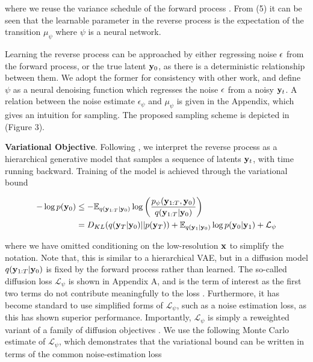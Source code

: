 where we reuse the variance schedule of the forward process \parencite{Ho2020}. From (5) it can be seen that the learnable parameter in the reverse process is the expectation of the transition $\mu_{\psi}$ where $\psi$ is a neural network. 

Learning the reverse process can be approached by either regressing noise $\bold{\epsilon}$ from the forward process, or the true latent $\bold{y}_{0}$, as there is a deterministic relationship between them. We adopt the former for consistency with other work, and define $\psi$ as a neural denoising function which regresses the noise $\bold{\epsilon}$ from a noisy $\bold{y}_{t}$. A relation between the noise estimate $\epsilon_{\psi}$ and $\mu_{\psi}$ is given in the Appendix, which gives an intuition for sampling. The proposed sampling scheme is depicted in (Figure 3). 

\textbf{Variational Objective}. Following \parencite{Kingma2021}, we interpret the reverse process as a hierarchical generative model that samples a sequence of latents $\bold{y}_{t}$, with time running backward. Training of the model is achieved through the variational bound

\begin{align}
-\log p(\bold{y}_{0}) &\leq -\mathbb{E}_{q(\bold{y}_{1:T}\lvert\bold{y}_{0})} \log \left(\frac{p_{\psi}(\bold{y}_{1:T},\bold{y}_{0})}{q(\bold{y}_{1:T}\lvert\bold{y}_{0})}\right) \\
&=  D_{KL}(q(\bold{y}_{T}\lvert\bold{y}_{0}) \lvert\lvert p(\bold{y}_{T})) + \mathbb{E}_{q(\bold{y}_{1}\lvert\bold{y}_{0})} \log p(\bold{y}_{0}\lvert\bold{y}_{1}) + \mathcal{L}_{\psi}
\end{align}

where we have omitted conditioning on the low-resolution $\bold{x}$ to simplify the notation. Note that, this is similar to a hierarchical VAE, but in a diffusion model $q(\bold{y}_{1:T}\lvert\bold{y}_{0})$ is fixed by the forward process rather than learned. The so-called diffusion loss $\mathcal{L}_{\psi}$ is shown in Appendix A, and is the term of interest as the first two terms do not contribute meaningfully to the loss \parencite{Ho2020}. Furthermore, it has become standard to use simplified forms of $\mathcal{L}_{\psi}$, such as a noise estimation loss, as this has shown superior performance. Importantly, $\mathcal{L}_{\psi}$ is simply a reweighted variant of a family of diffusion objectives \parencite{Kingma2021,Kingma2023}. We use the following Monte Carlo estimate of $\mathcal{L}_{\psi}$, which demonstrates that the variational bound can be written in terms of the common noise-estimation loss


